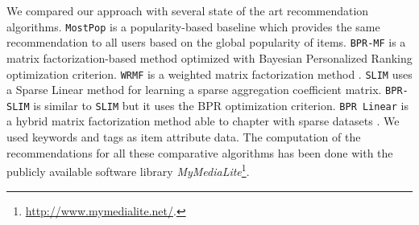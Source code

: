 We compared our approach with several state of the art recommendation algorithms. 
\texttt{MostPop} is a popularity-based baseline which provides the same recommendation to all users based on the global popularity of items. 
\texttt{BPR-MF} \cite{RendleFGS09} is a matrix factorization-based method optimized with Bayesian Personalized Ranking optimization criterion.
\texttt{WRMF} is a weighted matrix factorization method \cite{Hu2008}.
\texttt{SLIM} \cite{Ning2012} uses a Sparse Linear method for learning a sparse aggregation coefficient matrix.
\texttt{BPR-SLIM} is similar to \texttt{SLIM} but it uses the BPR optimization criterion.
\texttt{BPR Linear} is a hybrid matrix factorization method able to chapter with sparse datasets \cite{GantnerDFRS10}. We used keywords and tags as item attribute data. 
The computation of the recommendations for all these comparative algorithms has been done with the publicly available software library \textit{MyMediaLite}\footnote{\url{http://www.mymedialite.net/}.}.

